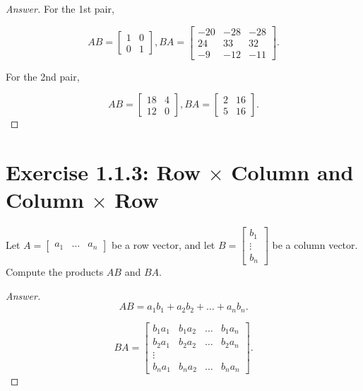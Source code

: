 \documentclass{amsbook}
\theoremstyle{definition}
\theoremstyle{remark}
\numberwithin{section}{chapter}
\numberwithin{equation}{chapter}
\begin{document}
\begin{proof}[Answer]

For the 1st pair,

\[AB=\begin{bmatrix}
1&0\\
0&1\end{bmatrix}, BA=\begin{bmatrix}
   -20  & -28  & -28\\
    24 &   33  &  32\\
    -9  & -12  & -11\end{bmatrix}.\]
    
For the 2nd pair,

\[AB=\begin{bmatrix}
    18   &  4\\
    12    &  0 \end{bmatrix}, BA=\begin{bmatrix}
     2   & 16 \\
     5   & 16 \end{bmatrix}. \]

\end{proof}

\section{Exercise 1.1.3: Row $\times$ Column and Column $\times$ Row}

Let $A=\begin{bmatrix}
a_1 & \dots & a_n
\end{bmatrix}$ be a row vector, and let $B=\begin{bmatrix}
b_1\\
\vdots\\
b_n
\end{bmatrix}$ be a column vector. Compute the products $AB$ and $BA$.

\begin{proof}[Answer]

\[AB=a_1b_1+a_2b_2+\dots+a_nb_n.\]

\[BA=\begin{bmatrix}
b_1a_1 & b_1a_2 & \dots & b_1a_n \\
b_2a_1 & b_2a_2 & \dots & b_2a_n \\
\vdots \\
b_na_1 & b_na_2 & \dots & b_na_n
\end{bmatrix}. \]

\end{proof}
\end{document}
